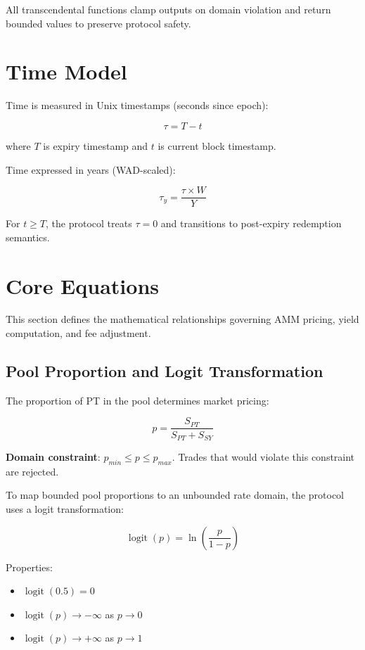 All transcendental functions clamp outputs on domain violation and return bounded values to preserve protocol safety.

\section{Time Model}

Time is measured in Unix timestamps (seconds since epoch):

\[
\tau = T - t
\]

where $T$ is expiry timestamp and $t$ is current block timestamp.

Time expressed in years (WAD-scaled):

\[
\tau_y = \frac{\tau \times W}{Y}
\]

For $t \geq T$, the protocol treats $\tau = 0$ and transitions to post-expiry redemption semantics.

\section{Core Equations}

This section defines the mathematical relationships governing AMM pricing, yield computation, and fee adjustment.

\subsection{Pool Proportion and Logit Transformation}

The proportion of PT in the pool determines market pricing:

\[
p = \frac{S_{PT}}{S_{PT} + S_{SY}}
\]

\textbf{Domain constraint}: $p_{min} \leq p \leq p_{max}$. Trades that would violate this constraint are rejected.

To map bounded pool proportions to an unbounded rate domain, the protocol uses a logit transformation:

\[
\operatorname{logit}(p) = \ln\left(\frac{p}{1-p}\right)
\]

Properties:
\begin{itemize}
    \item $\operatorname{logit}(0.5) = 0$
    \item $\operatorname{logit}(p) \to -\infty$ as $p \to 0$
    \item $\operatorname{logit}(p) \to +\infty$ as $p \to 1$
\end{itemize}

